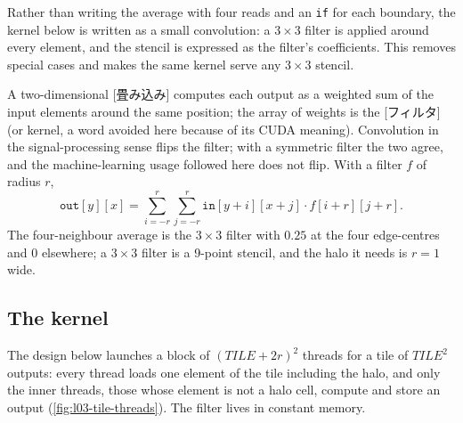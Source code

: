 \documentclass[../main.tex]{subfiles}
\begin{document}
Rather than writing the average with four reads and an \texttt{if} for
each boundary, the kernel below is written as a small convolution: a
$3\times3$ filter is applied around every element, and the stencil is
expressed as the filter's coefficients.  This removes special cases and
makes the same kernel serve any $3\times3$ stencil.

\begin{definition}
  A two-dimensional [畳み込み] computes each output as a
  weighted sum of the input elements around the same position; the array
  of weights is the [フィルタ] (or kernel, a word avoided here
  because of its CUDA meaning).  Convolution in the signal-processing
  sense flips the filter; with a symmetric filter the two agree, and the
  machine-learning usage followed here does not flip.  With a filter $f$
  of radius $r$,
  \begin{equation}
    \texttt{out}[y][x] = \sum_{i=-r}^{r} \sum_{j=-r}^{r}
      \texttt{in}[y+i][x+j] \cdot f[i+r][j+r].
    \label{eq:l03-convolution}
  \end{equation}
  The four-neighbour average is the $3\times3$ filter with $0.25$ at the
  four edge-centres and $0$ elsewhere; a $3\times3$ filter is a 9-point
  stencil, and the halo it needs is $r = 1$ wide.
\end{definition}

\subsection{The kernel}

\begin{marginfigure}
  \resizebox{\linewidth}{!}{}
  \caption{Thread roles in one block (drawn for $8\times8$ threads): the
    outer ring only loads halo cells; the inner threads load and compute.}
  \label{fig:l03-tile-threads}
\end{marginfigure}

The design below launches a block of $(\mathit{TILE}+2r)^2$ threads for
a tile of $\mathit{TILE}^2$ outputs: every thread loads one element of
the tile including the halo, and only the inner threads, those whose
element is not a halo cell, compute and store an output
(\cref{fig:l03-tile-threads}).  The filter lives in constant memory.
\end{document}
